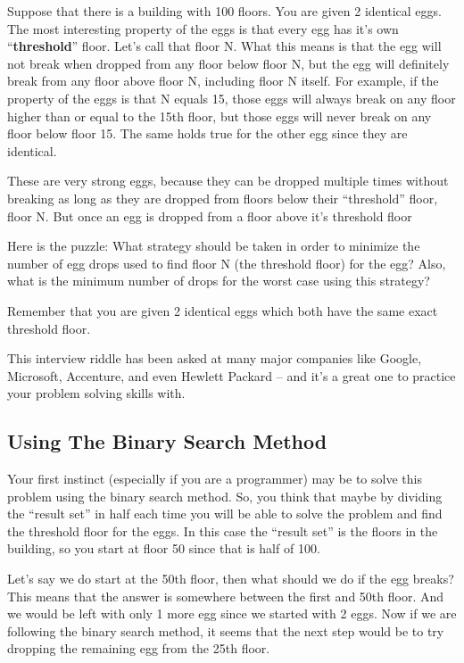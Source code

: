\documentclass[]{article}
\begin{document}
Suppose that there is a building with 100 floors. You are given 2 identical eggs. The most interesting property of the eggs is that every egg has it’s own ``\textbf{threshold}” floor. Let’s call that floor N. What this means is that the egg will not break when dropped from any floor below floor N, but the egg will definitely break from any floor above floor N, including floor N itself.
For example, if the property of the eggs is that N equals 15, those eggs will always break on any floor higher than or equal to the 15th floor, but those eggs will never break on any floor below floor 15. The same holds true for the other egg since they are identical.

These are very strong eggs, because they can be dropped multiple times without breaking as long as they are dropped from floors below their “threshold” floor, floor N. But once an egg is dropped from a floor above it’s threshold floor

Here is the puzzle: What strategy should be taken in order to minimize the number of egg drops used to find floor N (the threshold floor) for the egg? Also, what is the minimum number of drops for the worst case using this strategy?

Remember that you are given 2 identical eggs which both have the same exact threshold floor.

This interview riddle has been asked at many major companies like Google, Microsoft, Accenture, and even Hewlett Packard – and it’s a great one to practice your problem solving skills with.

\subsection{Using The Binary Search Method}

Your first instinct (especially if you are a programmer) may be to solve this problem using the binary search method. So, you think that maybe by dividing the “result set” in half each time you will be able to solve the problem and find the threshold floor for the eggs. In this case the “result set” is the floors in the building, so you start at floor 50 since that is half of 100.




 
Let’s say we do start at the 50th floor, then what should we do if the egg breaks? This means that the answer is somewhere between the first and 50th floor. And we would be left with only 1 more egg since we started with 2 eggs. Now if we are following the binary search method, it seems that the next step would be to try dropping the remaining egg from the 25th floor. 
\end{document}
